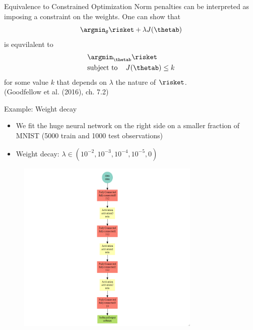 \begin{frame}{Equivalence to Constrained Optimization}
Norm penalties can be interpreted as imposing a constraint on the weights. One can show that 
 $$\argmin_{\theta} \risket + \lambda \text{\(J(\thetab)\)}$$
 is equvilalent to
 \begin{align*}
 & \argmin_{\thetab}  \risket \\
  &\text{subject to \;\;\;}  J(\thetab) \leq k
 \end{align*}
 for some value $k$ that depends on $\lambda$ the nature of 
 $\risket$.\\[0.3cm]
 \scriptsize{(Goodfellow et al. (2016), ch. 7.2)}
\end{frame}

\begin{vbframe}{Example: Weight decay}
\begin{minipage}{0.45\textwidth}
\begin{itemize}
\item We fit the huge neural network on the right side on a smaller fraction of MNIST (5000 train and 1000 test observations)
\item Weight decay: $\lambda \in (10^{-2}, 10^{-3}, 10^{-4}, 10^{-5}, 0)$
\end{itemize}
\end{minipage}
\begin{minipage}{0.45\textwidth}
\begin{figure}
\centering
\includegraphics[width=8.7cm]{../plots/mxnet_graph_decay.png}
\end{figure}
\end{minipage}
\framebreak


\end{vbframe}
